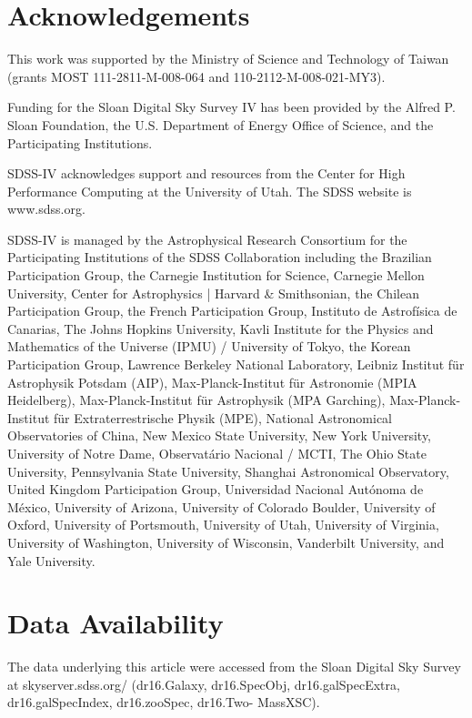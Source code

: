 \documentclass[fleqn,usenatbib]{mnras}
\begin{document}
\section*{Acknowledgements}

This work was supported by the Ministry of Science and Technology of Taiwan (grants MOST 111-2811-M-008-064 and 110-2112-M-008-021-MY3).

Funding for the Sloan Digital Sky Survey IV has been provided by the Alfred P. Sloan Foundation, the U.S. Department of Energy Office of Science, and the Participating Institutions. 

SDSS-IV acknowledges support and resources from the Center for High Performance Computing  at the University of Utah. The SDSS website is www.sdss.org.

SDSS-IV is managed by the Astrophysical Research Consortium for the Participating Institutions of the SDSS Collaboration including the Brazilian Participation Group, the Carnegie Institution for Science, Carnegie Mellon University, Center for Astrophysics | Harvard \& Smithsonian, the Chilean Participation Group, the French Participation Group, Instituto de Astrof\'isica de Canarias, The Johns Hopkins University, Kavli Institute for the Physics and Mathematics of the Universe (IPMU) / University of Tokyo, the Korean Participation Group, Lawrence Berkeley National Laboratory, Leibniz Institut f\"ur Astrophysik Potsdam (AIP),  Max-Planck-Institut f\"ur Astronomie (MPIA Heidelberg), Max-Planck-Institut f\"ur Astrophysik (MPA Garching), Max-Planck-Institut f\"ur Extraterrestrische Physik (MPE), National Astronomical Observatories of China, New Mexico State University, New York University, University of Notre Dame, Observat\'ario Nacional / MCTI, The Ohio State University, Pennsylvania State University, Shanghai Astronomical Observatory, United Kingdom Participation Group, Universidad Nacional Aut\'onoma de M\'exico, University of Arizona, University of Colorado Boulder, University of Oxford, University of Portsmouth, University of Utah, University of Virginia, University of Washington, University of Wisconsin, Vanderbilt University, and Yale University.


\section*{Data Availability}

The data underlying this article were accessed from the Sloan Digital Sky Survey at skyserver.sdss.org/ (dr16.Galaxy, dr16.SpecObj, dr16.galSpecExtra, dr16.galSpecIndex, dr16.zooSpec, dr16.Two- MassXSC).
\end{document}
